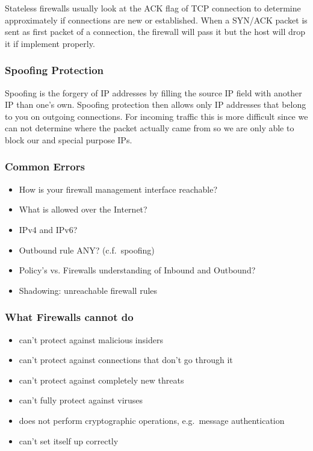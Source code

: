 Stateless firewalls usually look at the ACK flag of TCP connection to determine approximately if connections are new or established.
When a SYN/ACK packet is sent as first packet of a connection, the firewall will pass it but the host will drop it if implement properly.

\subsubsection*{Spoofing Protection}
Spoofing is the forgery of IP addresses by filling the source IP field with another IP than one's own.
Spoofing protection then allows only IP addresses that belong to you on outgoing connections.
For incoming traffic this is more difficult since we can not determine where the packet actually came from so we are only able to block our and special purpose IPs.

\subsubsection*{Common Errors}
\begin{itemize}[noitemsep, topsep=0pt]
  \item How is your firewall management interface reachable?
  \item What is allowed over the Internet?
  \item IPv4 and IPv6?
  \item Outbound rule ANY? (c.f.\ spoofing)
  \item Policy’s vs. Firewalls understanding of Inbound and Outbound?
  \item Shadowing: unreachable firewall rules
\end{itemize}

\subsubsection*{What Firewalls cannot do}
\begin{itemize}[noitemsep, topsep=0pt]
  \item can’t protect against malicious insiders
  \item can’t protect against connections that don’t go through it
  \item can’t protect against completely new threats
  \item can’t fully protect against viruses
  \item does not perform cryptographic operations, e.g.\ message authentication
  \item can’t set itself up correctly
\end{itemize}

